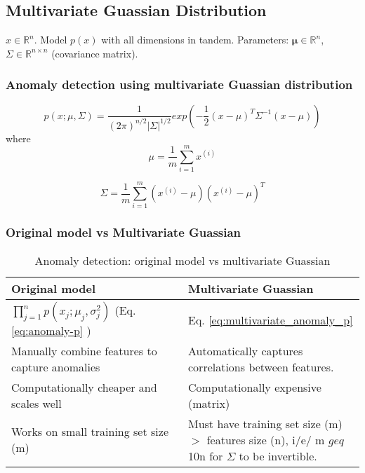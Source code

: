     \subsection{Multivariate Guassian Distribution}
        
    $x \in \mathbb{R}^n$. Model $p(x)$ with all dimensions in tandem. Parameters: $\boldsymbol{\mu} \in \mathbb{R}^n$, $\Sigma \in \mathbb{R}^{n \times n}$ (covariance matrix).
        
        \subsubsection{Anomaly detection using multivariate Guassian distribution}
        \begin{equation}
            p(x; \mu, \Sigma) = \frac{1}{(2\pi)^{n/2} |\Sigma|^{1/2}} exp (- \frac{1}{2} (x -\mu)^T \Sigma ^{-1} (x-\mu))        
            \label{eq:multivariate_anomaly_p}
        \end{equation}
        where 
            \begin{equation}
                \mu = \frac{1}{m} \sum_{i=1}^{m} x^{(i)}
                \label{eq:anomaly-mu-2}
            \end{equation}

            \begin{equation}
                \Sigma = \frac{1}{m} \sum_{i=1}^{m} (x^{(i)}-\mu) (x^{(i)}-\mu)^T
                \label{eq:}
            \end{equation}


        \subsubsection{Original model vs Multivariate Guassian}
            \begin{table}[htpb]
                \centering
                \begin{tabular}{|p{0.5\linewidth}|p{0.5\linewidth}|}
                    \hline
                    Original model & Multivariate Guassian \\
                    \hline
                    $\prod_{j=1}^{n} p(x_j;\mu_j, \sigma^2_j)$ (Eq. \ref{eq:anomaly-p} )& Eq. \ref{eq:multivariate_anomaly_p} \\
                    \hline
                    Manually combine features to capture anomalies & Automatically captures correlations between features. \\
                    \hline
                    Computationally cheaper and scales well & Computationally expensive (matrix) \\
                    \hline 
                    Works on small training set size (m) & Must have training set size (m) $>$ features size (n), i/e/ m $geq$ 10n for $\Sigma$ to be invertible.\\
                    \hline
                    
                \end{tabular}
                \caption{Anomaly detection: original model vs multivariate Guassian}
                \label{tab:anomaly-origin-multivariate}
            \end{table}
